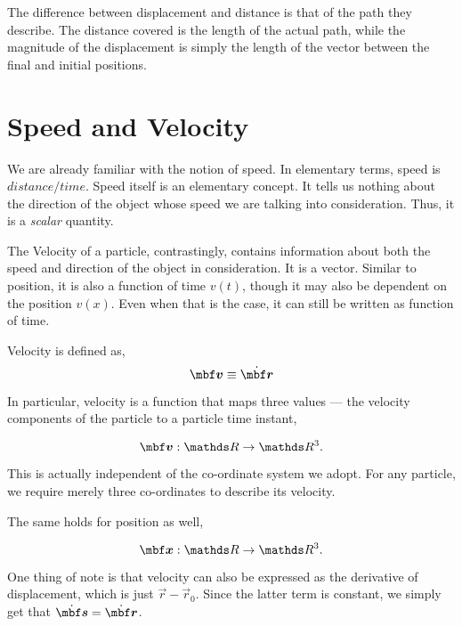 The difference between displacement and distance is that of the path they describe. The distance covered is the length
of the actual path, while the magnitude of the displacement is simply the length of the vector between the final and initial positions.

\section{Speed and Velocity}


We are already familiar with the notion of speed. In elementary terms, speed is \({distance}/{time}\).
Speed itself is an elementary concept. It tells us nothing about the direction of the object whose speed we are
talking into consideration. Thus, it is a \emph{scalar} quantity.

\parbreak
{}


The Velocity of a particle, contrastingly, contains information about both the speed and direction of the
object in consideration. 
It is a vector. Similar to position, it is also a function of time \(v(t)\), though it
may also be dependent on the position \(v(x)\). Even when that is the case,
it can still be written as function of time.

\begin{definition}
    [Velocity]
    \label{def: velocity}
    Velocity is defined as,
    \begin{equation}
        \vec{v} \equiv \ndiv{\vec{r}}    
    \end{equation}
\end{definition}

In particular, velocity is a function that maps three values --- the velocity components 
of the particle to a particle time instant, 

\[
    \vv : \RR \to \RR^3.
\] 

This is actually independent of the co-ordinate system we adopt. For any 
particle, we require merely three co-ordinates to describe its velocity. 

The same holds for position as well,

\[
    \vec{x} : \RR \to \RR^3.
\]

One thing of note is that velocity can also be expressed as the derivative of 
displacement, which is just \(\vec{r} - \vec{r}_0\). Since the latter 
term is constant, we simply get that \(\ndiv{\vec{s}} = \ndiv{\vec{r}}\).

